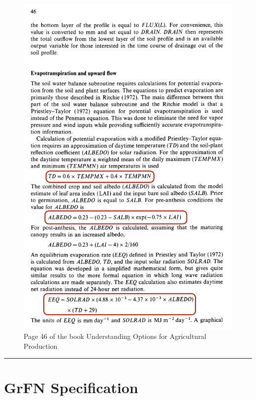\documentclass[article, 12pt, oneside]{memoir}
\begin{document}
\begin{figure}
\centering
\includegraphics{figs/petpt_equations_example.png}
\caption{Page 46 of the book Understanding Options for Agricultural
Production}
\end{figure}

\begin{center}\rule{0.5\linewidth}{\linethickness}\end{center}

\hypertarget{grfn-specification}{%
\section{GrFN Specification}\label{grfn-specification}}
\end{document}

